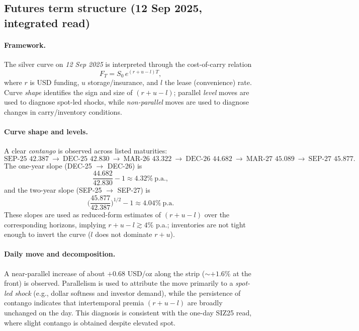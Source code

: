 \documentclass[11pt,a4paper]{article} %
\begin{document}
\subsection{Futures term structure (12 Sep 2025, integrated read)}

\paragraph{Framework.}
The silver curve on \emph{12 Sep 2025} is interpreted through the cost-of-carry relation
\[
F_T = S_0\,e^{(r+u-l)T},
\]
where \(r\) is USD funding, \(u\) storage/insurance, and \(l\) the lease (convenience) rate. Curve \emph{shape} identifies the sign and size of \((r+u-l)\); parallel \emph{level} moves are used to diagnose spot-led shocks, while \emph{non-parallel} moves are used to diagnose changes in carry/inventory conditions.

\paragraph{Curve shape and levels.}
A clear \emph{contango} is observed across listed maturities:
\[
\text{SEP-25 } \mathbf{42.387}\ \rightarrow\ \text{DEC-25 } \mathbf{42.830}\ \rightarrow\ \text{MAR-26 } \mathbf{43.322}\ \rightarrow\ \text{DEC-26 } \mathbf{44.682}\ \rightarrow\ \text{MAR-27 } \mathbf{45.089}\ \rightarrow\ \text{SEP-27 } \mathbf{45.877}.
\]
The one-year slope (DEC-25 \(\rightarrow\) DEC-26) is
\[
\frac{44.682}{42.830}-1 \approx \mathbf{4.32\%}\ \text{p.a.},
\]
and the two-year slope (SEP-25 \(\rightarrow\) SEP-27) is
\[
\Big(\frac{45.877}{42.387}\Big)^{1/2}-1 \approx \mathbf{4.04\%}\ \text{p.a.}
\]
These slopes are used as reduced-form estimates of \((r+u-l)\) over the corresponding horizons, implying \(r+u-l\gtrsim 4\%\) p.a.; inventories are not tight enough to invert the curve (\(l\) does not dominate \(r+u\)).

\paragraph{Daily move and decomposition.}
A near-parallel increase of about \(\mathbf{+0.68}\) USD/oz along the strip (\(\sim \mathbf{+1.6\%}\) at the front) is observed. Parallelism is used to attribute the move primarily to a \emph{spot-led shock} (e.g., dollar softness and investor demand), while the persistence of contango indicates that intertemporal premia \((r+u-l)\) are broadly unchanged on the day. This diagnosis is consistent with the one-day SIZ25 read, where slight contango is obtained despite elevated spot.
\end{document}
